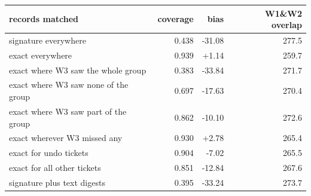 \begin{tabular}{lrrr}
\toprule
records matched & coverage & bias & W1\&W2 overlap \\
\midrule
signature everywhere & 0.438 & -31.08 & 277.5 \\
exact everywhere & 0.939 & +1.14 & 259.7 \\
exact where W3 saw the whole group & 0.383 & -33.84 & 271.7 \\
exact where W3 saw none of the group & 0.697 & -17.63 & 270.4 \\
exact where W3 saw part of the group & 0.862 & -10.10 & 272.6 \\
exact wherever W3 missed any & 0.930 & +2.78 & 265.4 \\
exact for undo tickets & 0.904 & -7.02 & 265.5 \\
exact for all other tickets & 0.851 & -12.84 & 267.6 \\
signature plus text digests & 0.395 & -33.24 & 273.7 \\
\bottomrule
\end{tabular}
\par{}
